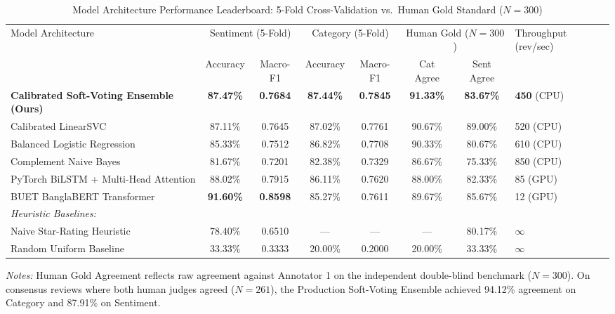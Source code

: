 \documentclass[5p,twocolumn,authoryear]{elsarticle}
\begin{document}
\begin{table}[t]
\centering
\caption{Model Architecture Performance Leaderboard: 5-Fold Cross-Validation vs.\ Human Gold Standard ($N=300$)}
\label{tab:model_leaderboard}
\footnotesize
\setlength{\tabcolsep}{4pt}
\begin{tabularx}{\textwidth}{@{}lccccccX@{}}
\toprule
\multirow{2}{*}{Model Architecture} & \multicolumn{2}{c}{Sentiment (5-Fold)} & \multicolumn{2}{c}{Category (5-Fold)} & \multicolumn{2}{c}{Human Gold ($N=300$)} & \multirow{2}{=}{Throughput (rev/sec)} \\
\cmidrule(lr){2-3} \cmidrule(lr){4-5} \cmidrule(lr){6-7}
& Accuracy & Macro-F1 & Accuracy & Macro-F1 & Cat Agree & Sent Agree & \\
\midrule
\textbf{Calibrated Soft-Voting Ensemble (Ours)} & \textbf{87.47\%} & \textbf{0.7684} & \textbf{87.44\%} & \textbf{0.7845} & \textbf{91.33\%} & \textbf{83.67\%} & \textbf{450} (CPU) \\
Calibrated LinearSVC & 87.11\% & 0.7645 & 87.02\% & 0.7761 & 90.67\% & 89.00\% & 520 (CPU) \\
Balanced Logistic Regression & 85.33\% & 0.7512 & 86.82\% & 0.7708 & 90.33\% & 80.67\% & 610 (CPU) \\
Complement Naive Bayes & 81.67\% & 0.7201 & 82.38\% & 0.7329 & 86.67\% & 75.33\% & 850 (CPU) \\
PyTorch BiLSTM + Multi-Head Attention & 88.02\% & 0.7915 & 86.11\% & 0.7620 & 88.00\% & 82.33\% & 85 (GPU) \\
BUET BanglaBERT Transformer & \textbf{91.60\%} & \textbf{0.8598} & 85.27\% & 0.7611 & 89.67\% & 85.67\% & 12 (GPU) \\
\addlinespace
\textit{Heuristic Baselines:} & & & & & & & \\
Naive Star-Rating Heuristic & 78.40\% & 0.6510 & --- & --- & --- & 80.17\% & $\infty$ \\
Random Uniform Baseline & 33.33\% & 0.3333 & 20.00\% & 0.2000 & 20.00\% & 33.33\% & $\infty$ \\
\bottomrule
\end{tabularx}
\vspace{0.4em}
\parbox{\textwidth}{\footnotesize \textit{Notes:} Human Gold Agreement reflects raw agreement against Annotator 1 on the independent double-blind benchmark ($N = 300$). On consensus reviews where both human judges agreed ($N = 261$), the Production Soft-Voting Ensemble achieved 94.12\% agreement on Category and 87.91\% on Sentiment.}
\end{table}
\end{document}

